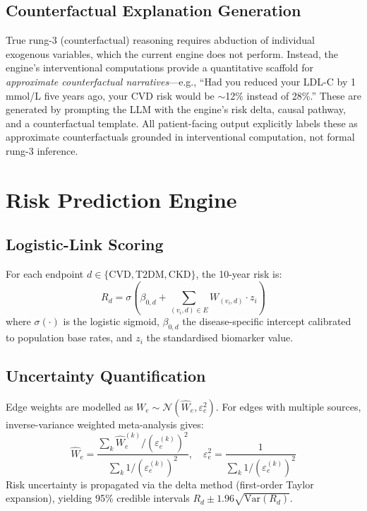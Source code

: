 \documentclass[runningheads]{llncs}
\begin{document}
\subsection{Counterfactual Explanation Generation}\label{sec:counterfactual}

True rung-3 (counterfactual) reasoning requires abduction of
individual exogenous variables, which the current engine does not
perform.
Instead, the engine's interventional computations provide a
quantitative scaffold for \emph{approximate counterfactual
narratives}---e.g., ``Had you reduced your LDL-C by 1\,mmol/L
five years ago, your CVD risk would be ${\sim}$12\% instead of
28\%.''
These are generated by prompting the LLM with the engine's risk
delta, causal pathway, and a counterfactual template.
All patient-facing output explicitly labels these as approximate
counterfactuals grounded in interventional computation, not formal
rung-3 inference.

\section{Risk Prediction Engine}\label{sec:risk}

\subsection{Logistic-Link Scoring}\label{sec:logistic}

For each endpoint $d \in \{\text{CVD}, \text{T2DM}, \text{CKD}\}$,
the 10-year risk is:
\begin{equation}\label{eq:risk}
R_d = \sigma\!\left(\beta_{0,d} + \sum_{(v_i, d) \in E} W_{(v_i,d)} \cdot z_i\right)
\end{equation}
where $\sigma(\cdot)$ is the logistic sigmoid, $\beta_{0,d}$ the
disease-specific intercept calibrated to population base rates, and
$z_i$ the standardised biomarker value.

\subsection{Uncertainty Quantification}\label{sec:uncert}

Edge weights are modelled as $W_e \sim \mathcal{N}(\hat{W}_e,
\varepsilon_e^2)$.
For edges with multiple sources, inverse-variance weighted
meta-analysis gives:
\begin{equation}\label{eq:meta}
\hat{W}_e = \frac{\sum_k \hat{W}_e^{(k)} / (\varepsilon_e^{(k)})^2}
{\sum_k 1 / (\varepsilon_e^{(k)})^2}, \quad
\varepsilon_e^2 = \frac{1}{\sum_k 1 / (\varepsilon_e^{(k)})^2}
\end{equation}
Risk uncertainty is propagated via the delta method (first-order
Taylor expansion), yielding 95\% credible intervals
$R_d \pm 1.96\sqrt{\mathrm{Var}(R_d)}$.
\end{document}
